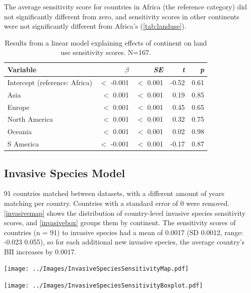 \documentclass[11pt, a4paper, titlepage]{article}
\begin{document}
    The average sensitivity score for countries in Africa (the reference category) did not significantly different from zero, and sensitivity scores in other continents were not significantly different from Africa's (\autoref{tab:landuse}).
    \begin{table}[h!]
    	\begin{center}
    		\caption{Results from a linear model explaining effects of continent on land use sensitivity scores. \textmd{N=167.}}
    		\label{tab:landuse}
    		\begin{tabular}{l|r|r|r|r} %
    			Variable & $\beta$ & \textit{SE} & \textit{t} & \textit{p}\\
    			\hline
    			Intercept (reference: Africa) & $<$ -0.001 & $<$ 0.001 & -0.52 & 0.61\\
    			Asia & $<$ 0.001 & $<$ 0.001 & 0.19 & 0.85\\
    			Europe & $<$ 0.001 & $<$ 0.001 & 0.45 & 0.65 \\
    			North America & $<$ 0.001 & $<$ 0.001 & 0.32 & 0.75\\
    			Oceania & $<$ 0.001 & $<$ 0.001 & 0.02 & 0.98\\
    			S America & $<$ -0.001 & $<$ 0.001 & -0.17 & 0.87\\
    		\end{tabular}
    	\end{center}
    \end{table}
    
    
	\subsection*{Invasive Species Model}

	
	91 countries matched between datasets, with a different amount of years matching per country. Countries with a standard error of 0 were removed. \autoref{invasivemap} shows the distribution of country-level invasive species sensitivity scores, and \autoref{invasivebox} groups them by continent. The sensitivity scores of countries (n = 91) to invasive species had a mean of 0.0017 (SD 0.0012, range: -0.023  0.055), so for each additional new invasive species, the average country's BII increases by 0.0017.\newline
	\begin{center}
		\texttt{[image: ../Images/InvasiveSpeciesSensitivityMap.pdf]}
		\label{invasivemap}
		
		\texttt{[image: ../Images/InvasiveSpeciesSensitivityBoxplot.pdf]}
		\label{invasivebox}
	\end{center}
\end{document}
